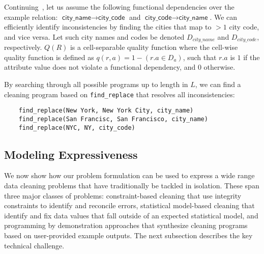 \begin{example}\label{ex3}
Continuing~, let us assume the following functional dependencies over the example relation: $\textsf{city\_name} \rightarrow \textsf{city\_code}$ and $\textsf{city\_code} \rightarrow \textsf{city\_name}$.
We can efficiently identify inconsistencies by finding the cities that map to $>1$ city code, and vice versa.   Let such city names and codes be denoted $D_{city\_name}$ and $D_{city\_code}$, respectively.
$Q(R)$ is a cell-separable quality function where the cell-wise quality function is defined as $q(r, a) = 1 - (r.a \in D_a)$, such that $r.a$ is $1$ if the attribute value does not violate a functional dependency, and $0$ otherwise.

By searching through all possible programs up to length  in $L$, we can find a cleaning program based on \texttt{find\_replace} that resolves all inconsistencies:
\begin{lstlisting}
    find_replace(New York, New York City, city_name)
    find_replace(San Francisc, San Francisco, city_name)
    find_replace(NYC, NY, city_code)
\end{lstlisting}
\end{example}







\subsection{Modeling Expressiveness}
We now show how our problem formulation can be used to express a wide range data cleaning problems that have traditionally be tackled in isolation.  These span three major classes of problems: constraint-based cleaning that use integrity constraints to identify and reconcile errors, statistical model-based  cleaning that identify and fix data values that fall outside of an expected statistical model, and programming by demonstration approaches that synthesize cleaning programs based on user-provided example outputs.   The next subsection describes the key technical challenge.


